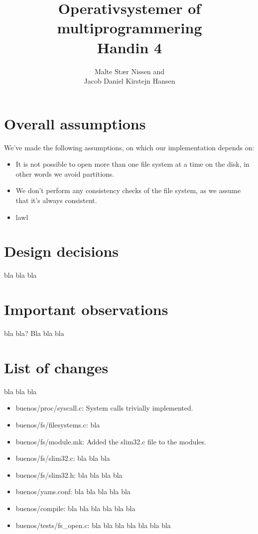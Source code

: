 \documentclass[11pt,a4paper]{article}
\title{Operativsystemer of multiprogrammering \\ Handin 4}
\author{Malte Stær Nissen and\\
        Jacob Daniel Kirstejn Hansen}
\begin{document}
\maketitle

\tableofcontents
\newpage

\section{Overall assumptions}
We've made the following assumptions, on which our implementation depends on:

\begin{itemize}
\item It is not possible to open more than one file system at a time on the
disk, in other words we avoid partitions.
\item We don't perform any consistency checks of the file system, as we assume
that it's always consistent.

\item lawl
\end{itemize}

\section{Design decisions}
bla bla bla 

\section{Important observations}
bla bla? Bla bla bla

\section{List of changes}
bla bla bla

\begin{itemize}
\item buenos/proc/syscall.c: System calls trivially implemented.
\item buenos/fs/filesystems.c: bla
\item buenos/fs/module.mk: Added the slim32.c file to the modules.
\item buenos/fs/slim32.c: bla bla bla
\item buenos/fs/slim32.h: bla bla bla bla
\item buenos/yams.conf: bla bla bla bla bla
\item buenos/compile: bla bla bla bla bla bla
\item buenos/tests/fs\_open.c: bla bla bla bla bla bla bla 
\end{itemize}
\end{document}
